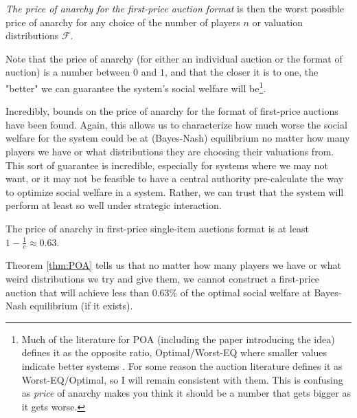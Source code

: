\documentclass[12pt,twoside]{reedthesis}
\begin{document}
\begin{dfn}  
{\em The price of anarchy for the first-price auction format} is then the worst possible price of anarchy for any choice of the number of players $n$ or valuation distributions $\mathcal{F}$.
\label{dfn:FormatPOA}
\end{dfn}

Note that the price of anarchy (for either an individual auction or the format of auction) is a number between $0$ and $1$, and that the closer it is to one, the "better" we can guarantee the system's social welfare will be\footnote{Much of the literature for POA (including the paper introducing the idea) defines it as the opposite ratio, Optimal/Worst-EQ where smaller values indicate better systems \citep{Koutsoupias1999}. For some reason the auction literature defines it as Worst-EQ/Optimal, so I will remain consistent with them. This is confusing as {\em price} of anarchy makes you think it should be a number that gets bigger as it gets worse.}.

Incredibly, bounds on the price of anarchy for the format of first-price auctions have been found. Again, this allows us to characterize how much worse the social welfare for the system could be at (Bayes-Nash) equilibrium no matter how many players we have or what distributions they are choosing their valuations from. This sort of guarantee is incredible, especially for systems where we may not want, or it may not be feasible to have a central authority pre-calculate the way to optimize social welfare in a system. Rather, we can trust that the system will perform at least so well under strategic interaction.

\begin{theorem}{\citep{Syrgkanis2013}}
	The price of anarchy in first-price single-item auctions format is at least $1-\frac{1}{e} \approx 0.63$.
	\label{thm:POA}	
\end{theorem}

Theorem \ref{thm:POA} tells us that no matter  how many players we have or what weird distributions we try and give them, we cannot construct a first-price auction that will achieve less than $0.63$\% of the optimal social welfare at Bayes-Nash equilibrium (if it exists). 
 
\end{document}
